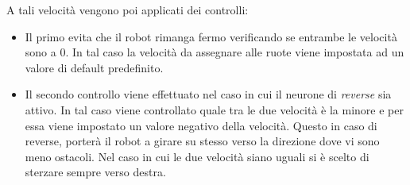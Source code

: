 A tali velocità vengono poi applicati dei controlli:
\begin{itemize}
    \item Il primo evita che il robot rimanga fermo verificando se entrambe le velocità sono a 0. In tal caso la velocità da assegnare alle ruote viene impostata ad un valore di default predefinito.
    \item Il secondo controllo viene effettuato nel caso in cui il neurone di \textit{reverse} sia attivo. In tal caso viene controllato quale tra le due velocità è la minore e per essa viene impostato un valore negativo della velocità. Questo in caso di reverse, porterà il robot a girare su stesso verso la direzione dove vi sono meno ostacoli. Nel caso in cui le due velocità siano uguali si è scelto di sterzare sempre verso destra.
\end{itemize} 